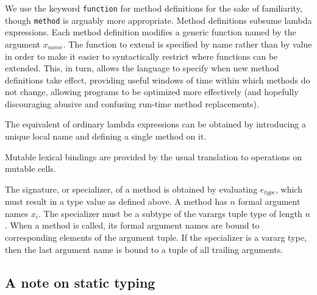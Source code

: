 We use the keyword \texttt{function} for method definitions for the sake of
familiarity, though \texttt{method} is arguably more appropriate. Method
definitions subsume lambda expressions. Each method definition modifies a
generic function named by the argument $x_{name}$. The function to extend is
specified by name rather than by value in order to make it easier to syntactically
restrict where functions can be extended. This, in turn, allows the language to
specify when new method definitions take effect, providing useful windows of
time within which methods do not change, allowing programs to be optimized more
effectively (and hopefully discouraging abusive and confusing run-time
method replacements).


The equivalent of ordinary lambda expressions can be obtained by introducing
a unique local name and defining a single method on it.

Mutable lexical bindings are provided by the usual translation to operations
on mutable cells.

The signature, or specializer, of a method is obtained by evaluating $e_{type}$,
which must result in a type value as defined above. A method has $n$
formal argument names $x_i$. The specializer must be a subtype of the
varargs tuple type of length $n$. When a method is called, its formal argument
names are bound to corresponding elements of the argument tuple. If the
specializer is a vararg type, then the last argument name is bound to a
tuple of all trailing arguments.

\subsection{A note on static typing}





